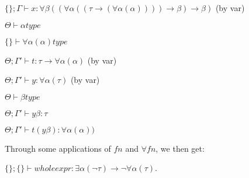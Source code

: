 \begin{enumerate}[label=(\alph*)]
\begin{enumerate}[label=(\roman*)]
                $\{\};\Gamma \vdash x : \forall \beta((\forall \alpha ((\tau \rightarrow (\forall \alpha (\alpha)))) \rightarrow \beta) \rightarrow \beta)$  (by var)

                $\Theta \vdash \alpha type$

                $\{\} \vdash \forall \alpha(\alpha) type$

                $\Theta;\Gamma' \vdash t : \tau \rightarrow \forall \alpha(\alpha)$ (by var)

                $\Theta;\Gamma' \vdash y : \forall \alpha(\tau)$ (by var)

                $\Theta \vdash \beta type$

                $\Theta;\Gamma' \vdash y \beta : \tau$

                $\Theta;\Gamma' \vdash t (y \beta) : \forall \alpha( \alpha))$

                Through some applications of $fn$ and $\forall fn$, we then get:

                $\{\};\{\} \vdash wholeexpr : \exists \alpha(\neg\tau) \rightarrow \neg \forall \alpha(\tau)$.


            
        \end{enumerate}


        
    \end{enumerate}

